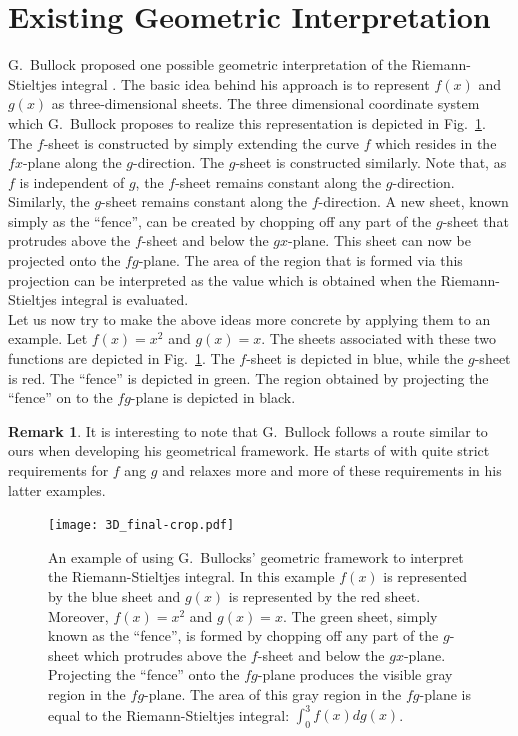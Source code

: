 \documentclass{article}
\theoremstyle{theorem}
\theoremstyle{definition}
\newtheorem*{remark}{Remark}
\begin{document}

\section{Existing Geometric Interpretation}
G.~Bullock proposed one possible geometric interpretation of the Riemann-Stieltjes integral \cite{bullock1988}. 
The basic idea behind his approach is to represent $f(x)$ and $g(x)$ as three-dimensional sheets. 
The three dimensional coordinate system which G.~Bullock proposes to realize this representation is depicted in 
Fig.~\ref{fig:bullock}. The $f$-sheet is constructed by simply extending the curve $f$ which resides in the $fx$-plane 
along the $g$-direction. The $g$-sheet is constructed similarly. Note that, as $f$ is independent of $g$, the $f$-sheet remains 
constant along the $g$-direction. Similarly, the $g$-sheet remains constant along the $f$-direction. 
A new sheet, known simply as the ``fence'', can be created by chopping off any part of the $g$-sheet that protrudes above the 
$f$-sheet and below the $gx$-plane. This sheet can now be projected onto the $fg$-plane. The area of the region that is formed 
via this projection can be interpreted as the value which is obtained when the Riemann-Stieltjes integral is evaluated.\\ 

\noindent
Let us now try to make the above ideas more concrete by applying them to an example. Let $f(x)=x^2$ and 
$g(x)=x$. The sheets associated with these two functions are depicted in Fig.~\ref{fig:bullock}. 
The $f$-sheet is depicted in blue, while the $g$-sheet is red. The ``fence'' is depicted in green. The region
obtained by projecting the ``fence'' on to the $fg$-plane is depicted in black.\\

\noindent
\begin{remark}
It is interesting to note that G.~Bullock follows a route similar to ours when developing his geometrical framework.
He starts of with quite strict requirements for $f$ ang $g$ and relaxes more and more of these requirements in his latter 
examples. 
\end{remark}

\begin{figure}[htb]
\centering
\texttt{[image: 3D\_final-crop.pdf]}
\caption{An example of using G.~Bullocks' geometric framework to interpret the Riemann-Stieltjes integral. In this example 
$f(x)$ is represented by the blue sheet and $g(x)$ is represented by the red sheet. Moreover, $f(x)=x^2$ and $g(x)=x$. The green sheet, simply known as the ``fence'', is formed 
by chopping off any part of the $g$-sheet which protrudes above the $f$-sheet and below the $gx$-plane. Projecting the ``fence''
onto the $fg$-plane produces the visible gray region in the $fg$-plane. The area of this gray region in the $fg$-plane is equal to the Riemann-Stieltjes integral:
$\int_{0}^{3} f(x) dg(x)$.}
\label{fig:bullock}
\end{figure}
\end{document}
